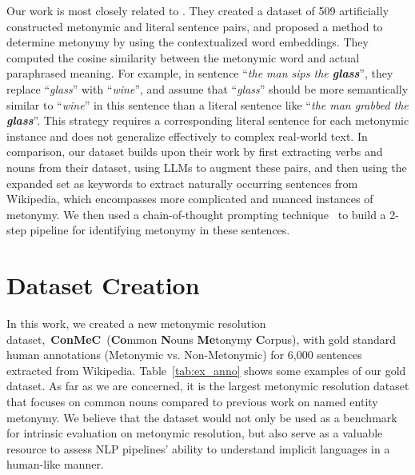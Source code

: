 \documentclass[11pt]{article}
\begin{document}
Our work is most closely related to \citet{pedinotti-lenci-2020-dont}. They created a dataset of 509 artificially constructed metonymic and literal sentence pairs, and proposed a method to determine metonymy by using the contextualized word embeddings. They computed the cosine similarity between the metonymic word and actual paraphrased meaning. For example, in sentence ``\textit{the man sips the \textbf{glass}}'', they replace ``\textit{glass}'' with ``\textit{wine}'', and assume that ``\textit{glass}'' should be more semantically similar to ``\textit{wine}'' in this sentence than a literal sentence like ``\textit{the man grabbed the \textbf{glass}}''. This strategy requires a corresponding literal sentence for each metonymic instance and does not generalize effectively to complex real-world text. In comparison, our dataset builds upon their work by first extracting verbs and nouns from their dataset, using LLMs to augment these pairs, and then using the expanded set as keywords to extract naturally occurring sentences from Wikipedia, which encompasses more complicated and nuanced instances of metonymy. We then used a chain-of-thought prompting technique~\citep{wei-chain-of-thought-prompting} 
to build a 2-step pipeline for identifying metonymy in these sentences.

\section{Dataset Creation}
In this work, we created a new metonymic resolution dataset,~\textbf{ConMeC}~(\textbf{Co}mmon \textbf{N}ouns \textbf{Me}tonymy \textbf{C}orpus), with gold standard human annotations (Metonymic vs. Non-Metonymic) for 6,000 sentences extracted from Wikipedia. Table~\ref{tab:ex_anno} shows some examples of our gold dataset. As far as we are concerned, it is the largest metonymic resolution dataset that focuses on common nouns compared to previous work on named entity metonymy. We believe that the dataset would not only be used as a benchmark for intrinsic evaluation on metonymic resolution, but also serve as a valuable resource to assess NLP pipelines' ability to understand implicit languages in a human-like manner.
\end{document}
